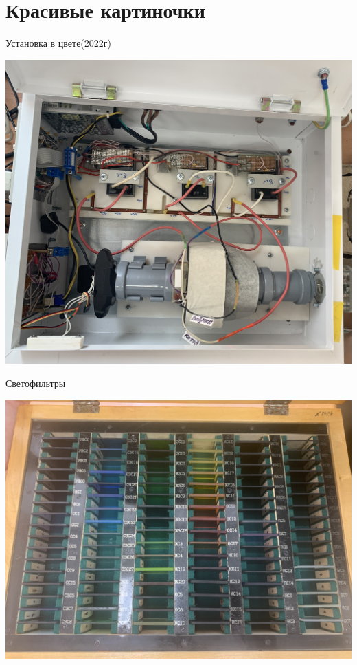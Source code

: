\documentclass[a4paper,12pt]{article}
\theoremstyle{plain} %
\theoremstyle{definition} %
\theoremstyle{remark} %
\begin{document}
\break

\section{Красивые картиночки}

Установка в цвете(2022г)

\includegraphics[scale = 0.1]{IMG_3534.jpg}

\hspace

Светофильтры

\includegraphics[scale = 0.1]{Пластинки.JPG}
\end{document}
